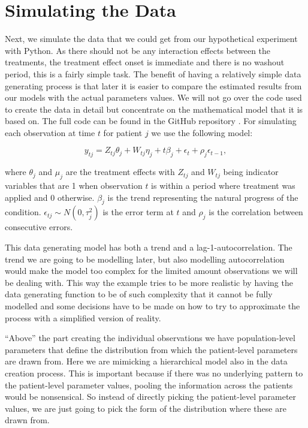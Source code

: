 \documentclass[12pt,a4paper,leqno]{report}
\theoremstyle{plain}
\theoremstyle{definition}
\theoremstyle{remark}
\begin{document}
\section{Simulating the Data}

Next, we simulate the data that we could get from our hypothetical experiment with Python.
As there should not be any interaction effects between the treatments, the treatment
effect onset is immediate and there is no washout period, this is a fairly simple
task. The benefit of having a relatively simple data generating process is that later it
is easier to compare the estimated results from our models with the actual parameters
values. We will not go over the code used to create the data in detail but concentrate on
the mathematical model that it is based on. The full code can be found in the GitHub repository
\cite{github}. For simulating each observation at time \(t\) for patient \(j\) we use the following model:

\begin{def}\label{simulationmodel}
    \begin{equation}\label{}
        y_{tj} = Z_{tj}\theta_{j} + W_{tj}\eta_{j} + t\beta_j + \epsilon_t + \rho_j\epsilon_{t-1},
    \end{equation}
\end{def}where \(\theta_j\) and \(\mu_j\) are the treatment effects with \(Z_{tj}\) and \(W_{tj}\) being indicator
variables that are 1 when observation \(t\) is within a period where treatment was applied and
0 otherwise. \(\beta_j\) is the trend representing the natural progress of the
condition. \(\epsilon_{tj} \sim N(0,\tau_j^2) \) is the error term at \(t\) and
\(\rho_j\) is the correlation between consecutive errors.

This data generating model has both a trend and a lag-1-autocorrelation. The trend we
are going to be modelling later, but also modelling autocorrelation would make the model
too complex for the limited amount observations we will be dealing with. This way the example tries to be more realistic
by having the data generating function to be of such complexity that it cannot be
fully modelled and some decisions have to be made on how to try to approximate
the process with a simplified version of reality.

``Above'' the part creating the individual observations we have population-level parameters
that define the distribution from which the patient-level parameters are drawn from.
Here we are mimicking a hierarchical model also in the data creation process. This is
important because if there was no underlying pattern to the patient-level parameter
values, pooling the information across the patients
would be nonsensical. So instead of directly picking the patient-level parameter values,
we are just going to pick the form of the distribution where these are drawn from.
\end{document}
